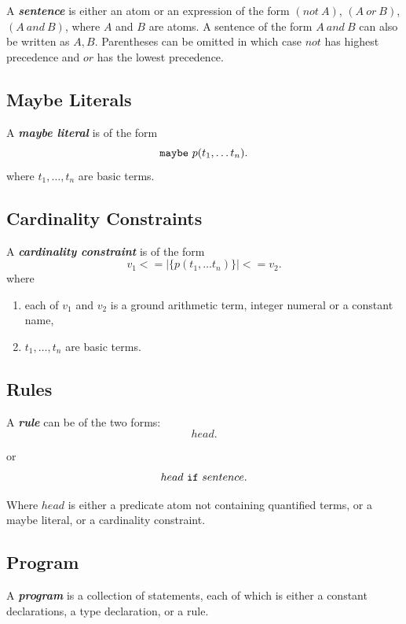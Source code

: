 \documentclass[a4paper,10pt]{article}
\begin{document}
A \textit{\textbf{sentence}} is either an atom or an expression of the form $(not~A)$, $(A~or~B)$, $(A~and~B)$, where $A$ and $B$ are atoms. A sentence of the form $A~and~B$
can also be written as $A, B$. Parentheses can be omitted in which case $not$ has highest precedence and $or$ has the lowest precedence. 

\subsection{Maybe Literals}

A \textbf{\textit{maybe literal}} is of the form $$\mbox{\texttt{maybe}}~p(t_1,\ldots t_n).$$ where $t_1,\ldots,t_n$ are basic terms.

\subsection{Cardinality Constraints}

A \textit{\textbf{cardinality constraint}} is of the form 
$$v_1 <= |\{p(t_1,\ldots t_n)\}| <= v_2.$$
where
\begin{enumerate}
\item each of $v_1$ and $v_2$ is a ground arithmetic term, integer numeral or a constant name, 
\item $t_1,\ldots,t_n$ are basic terms.
\end{enumerate}
\subsection{Rules} \label{rl}

A \textit{\textbf{rule}} can be of the two forms:
\begin{equation}\label{eq1}
  head. 
\end{equation}

or 
\begin{equation}
head~\mbox{\texttt{if}}~sentence.
\end{equation}

Where $head$ is either a predicate atom not containing quantified terms, or a maybe literal, or a cardinality constraint.

\subsection{Program} \label{progdef}
A \textbf{\textit{program}} is a collection of statements, each of which is either a constant declarations, a
 type declaration, or a rule.
\end{document}
